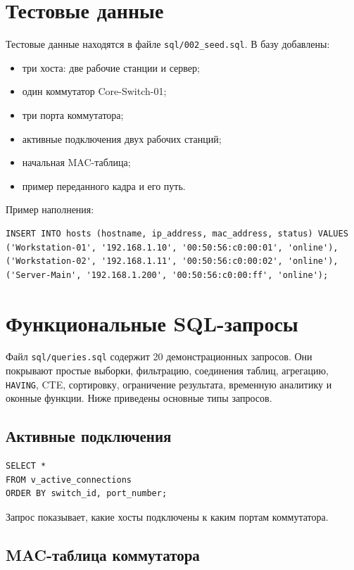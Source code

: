 \documentclass[12pt,a4paper]{article}
\begin{document}
\section{Тестовые данные}

Тестовые данные находятся в файле \texttt{sql/002\_seed.sql}. В базу добавлены:
\begin{itemize}
    \item три хоста: две рабочие станции и сервер;
    \item один коммутатор Core-Switch-01;
    \item три порта коммутатора;
    \item активные подключения двух рабочих станций;
    \item начальная MAC-таблица;
    \item пример переданного кадра и его путь.
\end{itemize}

Пример наполнения:

\begin{lstlisting}[caption={Добавление хостов}]
INSERT INTO hosts (hostname, ip_address, mac_address, status) VALUES
('Workstation-01', '192.168.1.10', '00:50:56:c0:00:01', 'online'),
('Workstation-02', '192.168.1.11', '00:50:56:c0:00:02', 'online'),
('Server-Main', '192.168.1.200', '00:50:56:c0:00:ff', 'online');
\end{lstlisting}

\section{Функциональные SQL-запросы}

Файл \texttt{sql/queries.sql} содержит 20 демонстрационных запросов. Они покрывают простые выборки, фильтрацию, соединения таблиц, агрегацию, \texttt{HAVING}, CTE, сортировку, ограничение результата, временную аналитику и оконные функции. Ниже приведены основные типы запросов.

\subsection{Активные подключения}

\begin{lstlisting}
SELECT *
FROM v_active_connections
ORDER BY switch_id, port_number;
\end{lstlisting}

Запрос показывает, какие хосты подключены к каким портам коммутатора.

\subsection{MAC-таблица коммутатора}
\end{document}
